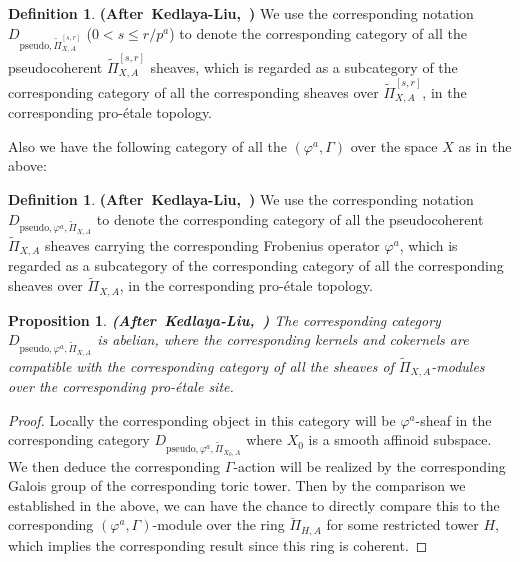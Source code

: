 \documentclass[12pt]{amsart}
\newtheorem{proposition}[theorem]{Proposition}
\theoremstyle{definition}
\newtheorem{definition}[theorem]{Definition}
\numberwithin{equation}{section}
\begin{document}
\begin{definition}\mbox{\bf{(After Kedlaya-Liu, \cite[Definition 8.10.1]{KL16})}}
We use the corresponding notation $D_{\mathrm{pseudo},\widetilde{\Pi}^{[s,r]}_{X,A}}$ ($0<s\leq r/p^{a}$) to denote the corresponding category of all the pseudocoherent $\widetilde{\Pi}^{[s,r]}_{X,A}$ sheaves, which is regarded as a subcategory of the corresponding category of all the corresponding sheaves over $\widetilde{\Pi}^{[s,r]}_{X,A}$, in the corresponding pro-\'etale topology.	
\end{definition}


\indent Also we have the following category of all the $(\varphi^a,\Gamma)$ over the space $X$ as in the above:


\begin{definition}\mbox{\bf{(After Kedlaya-Liu, \cite[Definition 8.10.5]{KL16})}}
We use the corresponding notation $D_{\mathrm{pseudo},\varphi^a,\widetilde{\Pi}_{X,A}}$ to denote the corresponding category of all the pseudocoherent $\widetilde{\Pi}_{X,A}$ sheaves carrying the corresponding Frobenius operator $\varphi^a$, which is regarded as a subcategory of the corresponding category of all the corresponding sheaves over $\widetilde{\Pi}_{X,A}$, in the corresponding pro-\'etale topology.	
\end{definition}




\begin{proposition} \mbox{\bf{(After Kedlaya-Liu, \cite[Theorem 8.10.6]{KL16})}} \label{proposition6.3}
The corresponding category $D_{\mathrm{pseudo},\varphi^a,\widetilde{\Pi}_{X,A}}$ is abelian, where the corresponding kernels and cokernels are compatible with the corresponding category of all the sheaves of $\widetilde{\Pi}_{X,A}$-modules over the corresponding pro-\'etale site.	
\end{proposition}

\begin{proof}
Locally the corresponding object in this category will be $\varphi^a$-sheaf in the corresponding category $D_{\mathrm{pseudo},\varphi^a,\widetilde{\Pi}_{X_0,A}}$ where $X_0$ is a smooth affinoid subspace. We then deduce the corresponding $\Gamma$-action will be realized by the corresponding Galois group of the corresponding toric tower. Then by the comparison we established in the above, we can have the chance to directly compare this to the corresponding $(\varphi^a,\Gamma)$-module over the ring $\breve{\Pi}_{H,A}$ for some restricted tower $H$, which implies the corresponding result since this ring is coherent. 	
\end{proof}
\end{document}
